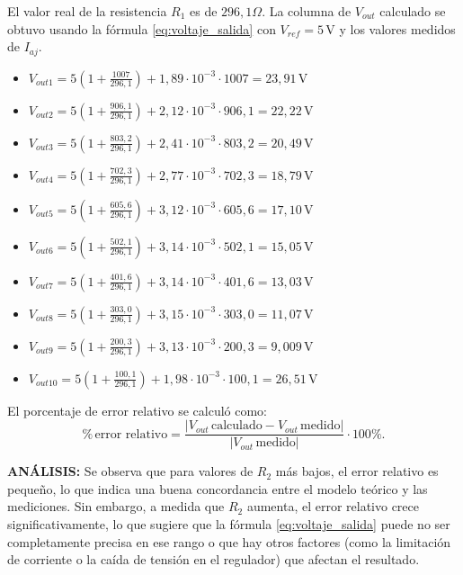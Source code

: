 \documentclass[12pt,a4paper]{article}
\begin{document}
El valor real de la resistencia $R_1$ es de $296,1 \Omega$.
La columna de $V_{out}$ calculado se obtuvo usando la fórmula \ref{eq:voltaje_salida} con $V_{ref}=5\,$V y los valores medidos de $I_{aj}$.
\begin{itemize}
	\item $V_{out1} = 5 \left(1 + \frac{1007}{296,1}\right) + 1,89 \cdot 10^{-3} \cdot 1007=23,91\,$V
	\item $V_{out2} = 5 \left(1 + \frac{906,1}{296,1}\right) + 2,12 \cdot 10^{-3} \cdot 906,1=22,22\,$V
	\item $V_{out3} = 5 \left(1 + \frac{803,2}{296,1}\right) + 2,41 \cdot 10^{-3} \cdot 803,2=20,49\,$V
	\item $V_{out4} = 5 \left(1 + \frac{702,3}{296,1}\right) + 2,77 \cdot 10^{-3} \cdot 702,3=18,79\,$V
	\item $V_{out5} = 5 \left(1 + \frac{605,6}{296,1}\right) + 3,12 \cdot 10^{-3} \cdot 605,6=17,10\,$V
	\item $V_{out6} = 5 \left(1 + \frac{502,1}{296,1}\right) + 3,14 \cdot 10^{-3} \cdot 502,1=15,05\,$V
	\item $V_{out7} = 5 \left(1 + \frac{401,6}{296,1}\right) + 3,14 \cdot 10^{-3} \cdot 401,6=13,03\,$V
	\item $V_{out8} = 5 \left(1 + \frac{303,0}{296,1}\right) + 3,15 \cdot 10^{-3} \cdot 303,0=11,07\,$V
	\item $V_{out9} = 5 \left(1 + \frac{200,3}{296,1}\right) + 3,13 \cdot 10^{-3} \cdot 200,3=9,009\,$V
	\item $V_{out10} = 5 \left(1 + \frac{100,1}{296,1}\right) + 1,98 \cdot 10^{-3} \cdot 100,1=26,51\,$V
\end{itemize}

El porcentaje de error relativo se calculó como:
\begin{equation}
\%\,\text{error relativo}=\frac{|V_{out}\,\text{calculado}-V_{out}\,\text{medido}|}{|V_{out}\,\text{medido}|}\cdot 100\%.
\end{equation}

\textbf{ANÁLISIS:} Se observa que para valores de $R_2$ más bajos, el error relativo es pequeño, lo que indica una buena concordancia entre el modelo teórico y las mediciones. Sin embargo, a medida que $R_2$ aumenta, el error relativo crece significativamente, lo que sugiere que la fórmula \ref{eq:voltaje_salida} puede no ser completamente precisa en ese rango o que hay otros factores (como la limitación de corriente o la caída de tensión en el regulador) que afectan el resultado.
\end{document}

